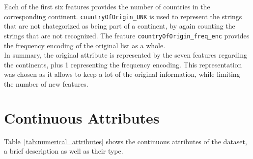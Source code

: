 Each of the first six features provides the number of countries in the corresponding continent.
\texttt{countryOfOrigin\_UNK} is used to represent the strings that are not chategorized as being part of a
continent, by again counting the strings that are not recognized.
The feature \texttt{countryOfOrigin\_freq\_enc} provides the frequency encoding of the
original list as a whole.\\

In summary, the original attribute is represented by the seven features regarding
the continents, plus 1 representing the frequency encoding. This representation was chosen as it allows to
keep a lot of the original information, while limiting the number of new features.\\




\section{Continuous Attributes}
Table~\ref{tab:numerical_attributes} shows the continuous attributes of the dataset,
a brief description as well as their type.
